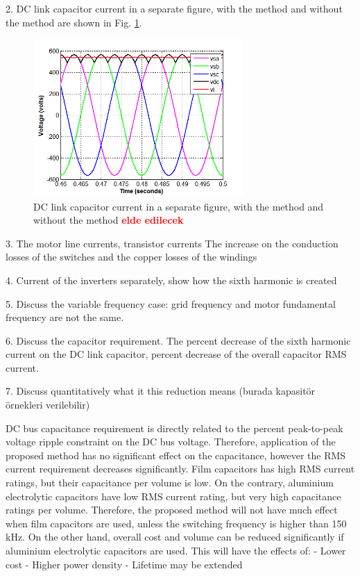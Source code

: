 \documentclass[conference,a4paper,twocolumn]{IEEEtran}
\begin{document}
2. DC link capacitor current in a separate figure, with the method and without the method are shown in Fig. \ref{fig:sample}.

\begin{figure}[h]
  \centering
  \includegraphics[width=8cm]{images/sample}
  \caption{DC link capacitor current in a separate figure, with the method and without the method  \textbf{\textcolor{red}{elde edilecek}}}
  \label{fig:sample}
\end{figure}
3. The motor line currents, transistor currents
The increase on the conduction losses of the switches and the copper losses of the windings

4. Current of the inverters separately, show how the sixth harmonic is created

5. Discuss the variable frequency case: grid frequency and motor fundamental frequency are not the same.

6. Discuss the capacitor requirement. The percent decrease of the sixth harmonic current on the DC link capacitor, percent decrease of the overall capacitor RMS current.

7. Discuss quantitatively what it this reduction means (burada kapasitör örnekleri verilebilir)

DC bus capacitance requirement is directly related to the percent peak-to-peak voltage ripple constraint on the DC bus voltage. Therefore, application of the proposed method has no significant effect on the capacitance, however the RMS current requirement decreases significantly.
Film capacitors has high RMS current ratings, but their capacitance per volume is low. On the contrary, aluminium electrolytic capacitors have low RMS current rating, but very high capacitance ratings per volume. Therefore, the proposed method will not have much effect when film capacitors are used, unless the switching frequency is higher than 150 kHz. On the other hand, overall cost and volume can be reduced significantly if aluminium electrolytic capacitors are used.
This will have the effects of:
- Lower cost
- Higher power density
- Lifetime may be extended
\end{document}

